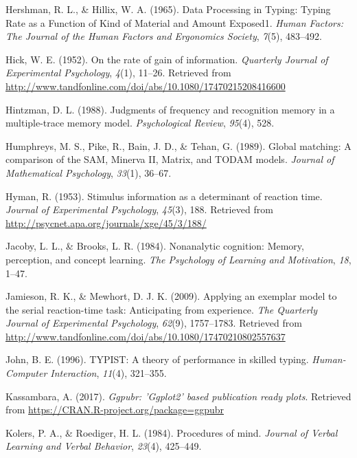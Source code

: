 \documentclass[floatsintext,man]{apa6}
\theoremstyle{definition}
\theoremstyle{definition}
\theoremstyle{definition}
\theoremstyle{remark}
\begin{document}
\hypertarget{ref-HershmanDataProcessingTyping1965}{}
Hershman, R. L., \& Hillix, W. A. (1965). Data Processing in Typing:
Typing Rate as a Function of Kind of Material and Amount Exposed1.
\emph{Human Factors: The Journal of the Human Factors and Ergonomics
Society}, \emph{7}(5), 483--492.

\hypertarget{ref-hick_rate_1952}{}
Hick, W. E. (1952). On the rate of gain of information. \emph{Quarterly
Journal of Experimental Psychology}, \emph{4}(1), 11--26. Retrieved from
\url{http://www.tandfonline.com/doi/abs/10.1080/17470215208416600}

\hypertarget{ref-hintzman_judgments_1988}{}
Hintzman, D. L. (1988). Judgments of frequency and recognition memory in
a multiple-trace memory model. \emph{Psychological Review},
\emph{95}(4), 528.

\hypertarget{ref-humphreys_global_1989}{}
Humphreys, M. S., Pike, R., Bain, J. D., \& Tehan, G. (1989). Global
matching: A comparison of the SAM, Minerva II, Matrix, and TODAM models.
\emph{Journal of Mathematical Psychology}, \emph{33}(1), 36--67.

\hypertarget{ref-hyman_stimulus_1953}{}
Hyman, R. (1953). Stimulus information as a determinant of reaction
time. \emph{Journal of Experimental Psychology}, \emph{45}(3), 188.
Retrieved from \url{http://psycnet.apa.org/journals/xge/45/3/188/}

\hypertarget{ref-JacobyNonanalyticcognitionMemory1984}{}
Jacoby, L. L., \& Brooks, L. R. (1984). Nonanalytic cognition: Memory,
perception, and concept learning. \emph{The Psychology of Learning and
Motivation}, \emph{18}, 1--47.

\hypertarget{ref-jamieson_applying_2009}{}
Jamieson, R. K., \& Mewhort, D. J. K. (2009). Applying an exemplar model
to the serial reaction-time task: Anticipating from experience.
\emph{The Quarterly Journal of Experimental Psychology}, \emph{62}(9),
1757--1783. Retrieved from
\url{http://www.tandfonline.com/doi/abs/10.1080/17470210802557637}

\hypertarget{ref-john_typist:_1996}{}
John, B. E. (1996). TYPIST: A theory of performance in skilled typing.
\emph{Human-Computer Interaction}, \emph{11}(4), 321--355.

\hypertarget{ref-R-ggpubr}{}
Kassambara, A. (2017). \emph{Ggpubr: 'Ggplot2' based publication ready
plots}. Retrieved from \url{https://CRAN.R-project.org/package=ggpubr}

\hypertarget{ref-KolersProceduresmind1984}{}
Kolers, P. A., \& Roediger, H. L. (1984). Procedures of mind.
\emph{Journal of Verbal Learning and Verbal Behavior}, \emph{23}(4),
425--449.
\end{document}
